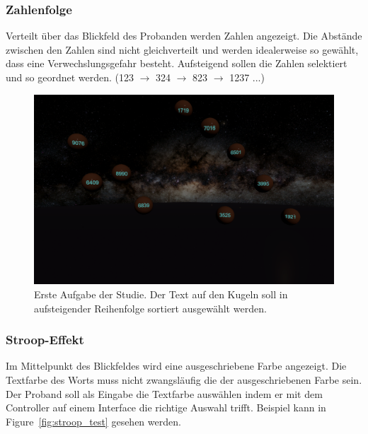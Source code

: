 \subsubsection{Zahlenfolge} 
Verteilt über das Blickfeld des Probanden werden Zahlen angezeigt. Die Abstände zwischen den Zahlen sind nicht gleichverteilt und werden idealerweise so gewählt, dass eine Verwechslungsgefahr besteht. Aufsteigend sollen die Zahlen selektiert und so geordnet werden. (123 $\rightarrow$ 324 $\rightarrow$ 823 $\rightarrow$ 1237 ...)

\begin{figure}
	\includegraphics[width=\textwidth]{./images/ordering.png}
	\caption{Erste Aufgabe der Studie. Der Text auf den Kugeln soll in aufsteigender Reihenfolge sortiert ausgewählt werden.}
	\label{fig:ordeing}
\end{figure}

\subsubsection{Stroop-Effekt} 
Im Mittelpunkt des Blickfeldes wird eine ausgeschriebene Farbe angezeigt. Die Textfarbe des Worts muss nicht zwangsläufig die der ausgeschriebenen Farbe sein. Der Proband soll als Eingabe die Textfarbe auswählen indem er mit dem Controller auf einem Interface die richtige Auswahl trifft. Beispiel kann in Figure~\ref{fig:stroop_test} gesehen werden.

